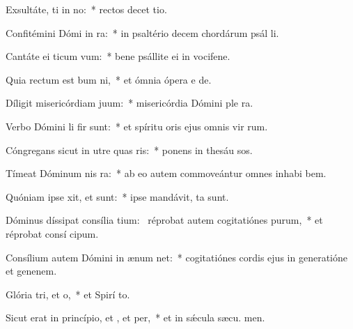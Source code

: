 \item Exsultáte, ti in no:~* rectos decet tio.
\item Confitémini Dómi in ra:~* in psaltério decem chordárum psál li.
\item Cantáte ei ticum vum:~* bene psállite ei in vocifene.
\item Quia rectum est bum ni,~* et ómnia ópera e  de.
\item Díligit misericórdiam  juum:~* misericórdia Dómini ple  ra.
\item Verbo Dómini li fir sunt:~* et spíritu oris ejus omnis vir rum.
\item Cóngregans sicut in utre quas ris:~* ponens in thesáu sos.
\item Tímeat Dóminum nis ra:~* ab eo autem commoveántur omnes inhabi bem.
\item Quóniam ipse xit, et  sunt:~* ipse mandávit,  ta sunt.
\item Dóminus díssipat consília tium:~\pscross{} réprobat autem cogitatiónes purum,~* et réprobat consí cipum.
\item Consílium autem Dómini in ænum net:~* cogitatiónes cordis ejus in generatióne et genenem.
\item Glória tri, et o,~* et Spirí to.
\item Sicut erat in princípio, et , et per,~* et in sǽcula sæcu. men.

